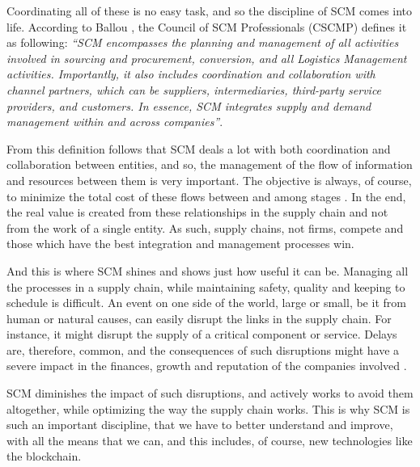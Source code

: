  Coordinating all of these is no easy task, and so the discipline of SCM comes into life. According to Ballou \cite{Ballou2007}, the Council of SCM Professionals (CSCMP) defines it as following: \textit{“SCM encompasses the planning and management of all activities involved in sourcing and procurement, conversion, and all Logistics Management activities. Importantly, it also includes coordination and collaboration with channel partners, which can be suppliers, intermediaries, third-party service providers, and customers. In essence, SCM integrates supply and demand management within and across companies”}.
  

From this definition follows that SCM deals a lot with both coordination and collaboration between entities, and so, the management of the flow of information and resources between them is very important. The objective is always, of course, to minimize the total cost of these flows between and among stages \cite{Habib2011}.
In the end, the real value is created from these relationships in the supply chain and not from the work of a single entity. As such, supply chains, not firms, compete and those which have the best integration and management processes win.

 
And this is where SCM shines and shows just how useful it can be. Managing all the processes in a supply chain, while maintaining safety, quality and keeping to schedule is difficult. An event on one side of the world, large or small, be it from human or natural causes, can easily disrupt the links in the supply chain. For instance, it might disrupt the supply of a critical component or service. Delays are, therefore, common, and the consequences of such disruptions might have a severe impact in the finances, growth and reputation of the companies involved \cite{Punter2013}.

SCM diminishes the impact of such disruptions, and actively works to avoid them altogether, while optimizing the way the supply chain works. This is why SCM is such an important discipline, that we have to better understand and improve, with all the means that we can, and this includes, of course, new technologies like the blockchain.


